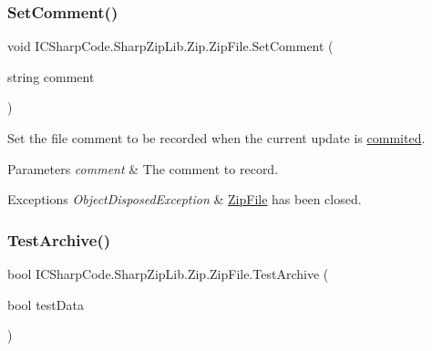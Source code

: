 \subsubsection{\texorpdfstring{Set\+Comment()}{SetComment()}}
{\footnotesize\ttfamily void I\+C\+Sharp\+Code.\+Sharp\+Zip\+Lib.\+Zip.\+Zip\+File.\+Set\+Comment (\begin{DoxyParamCaption}\item[{string}]{comment }\end{DoxyParamCaption})\hspace{0.3cm}{\ttfamily [inline]}}



Set the file comment to be recorded when the current update is \hyperlink{class_i_c_sharp_code_1_1_sharp_zip_lib_1_1_zip_1_1_zip_file_a047075c793bc97073b0531d6d0317bd9}{commited}. 


\begin{DoxyParams}{Parameters}
{\em comment} & The comment to record.\\
\hline
\end{DoxyParams}

\begin{DoxyExceptions}{Exceptions}
{\em Object\+Disposed\+Exception} & \hyperlink{class_i_c_sharp_code_1_1_sharp_zip_lib_1_1_zip_1_1_zip_file}{Zip\+File} has been closed.\\
\hline
\end{DoxyExceptions}
\mbox{\label{class_i_c_sharp_code_1_1_sharp_zip_lib_1_1_zip_1_1_zip_file_ad56b307a8abbf5d68330e0ffe0a0d007}} 
\subsubsection{\texorpdfstring{Test\+Archive()}{TestArchive()}\hspace{0.1cm}{\footnotesize\ttfamily [1/2]}}
{\footnotesize\ttfamily bool I\+C\+Sharp\+Code.\+Sharp\+Zip\+Lib.\+Zip.\+Zip\+File.\+Test\+Archive (\begin{DoxyParamCaption}\item[{bool}]{test\+Data }\end{DoxyParamCaption})\hspace{0.3cm}{\ttfamily [inline]}}



